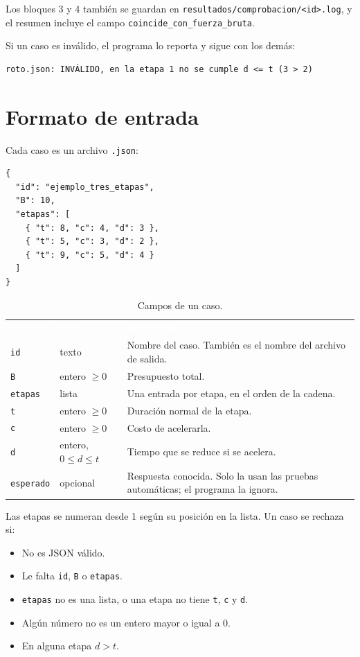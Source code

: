 \documentclass[11pt,a4paper]{article}
\newcommand{\cod}[1]{\texttt{#1}}
\newcommand{\encabezado}{\rowcolor{fondo}}
\newcommand{\blanco}[1]{\textcolor{white}{\textbf{#1}}}
\begin{document}
Los bloques 3 y 4 también se guardan en \cod{resultados/comprobacion/<id>.log}, y el resumen incluye el campo \cod{coincide\_con\_fuerza\_bruta}.

Si un caso es inválido, el programa lo reporta y sigue con los demás:

\begin{lstlisting}
roto.json: INVÁLIDO, en la etapa 1 no se cumple d <= t (3 > 2)
\end{lstlisting}

\section{Formato de entrada}
\label{sec:entrada}

Cada caso es un archivo \cod{.json}:

\begin{lstlisting}
{
  "id": "ejemplo_tres_etapas",
  "B": 10,
  "etapas": [
    { "t": 8, "c": 4, "d": 3 },
    { "t": 5, "c": 3, "d": 2 },
    { "t": 9, "c": 5, "d": 4 }
  ]
}
\end{lstlisting}

\begin{table}[H]
\centering\small
\renewcommand{\arraystretch}{1.2}
\begin{tabularx}{\textwidth}{@{}llX@{}}
\encabezado \blanco{Campo} & \blanco{Tipo} & \blanco{Significado} \\
\cod{id} & texto & Nombre del caso. También es el nombre del archivo de salida. \\
\cod{B} & entero $\ge 0$ & Presupuesto total. \\
\cod{etapas} & lista & Una entrada por etapa, en el orden de la cadena. \\
\cod{t} & entero $\ge 0$ & Duración normal de la etapa. \\
\cod{c} & entero $\ge 0$ & Costo de acelerarla. \\
\cod{d} & entero, $0\le d\le t$ & Tiempo que se reduce si se acelera. \\
\cod{esperado} & opcional & Respuesta conocida. Solo la usan las pruebas automáticas; el programa la ignora. \\
\bottomrule
\end{tabularx}
\caption{Campos de un caso.}
\end{table}

Las etapas se numeran desde 1 según su posición en la lista. Un caso se rechaza si:
\begin{itemize}
  \item No es JSON válido.
  \item Le falta \cod{id}, \cod{B} o \cod{etapas}.
  \item \cod{etapas} no es una lista, o una etapa no tiene \cod{t}, \cod{c} y \cod{d}.
  \item Algún número no es un entero mayor o igual a 0.
  \item En alguna etapa $d > t$.
\end{itemize}
\end{document}
